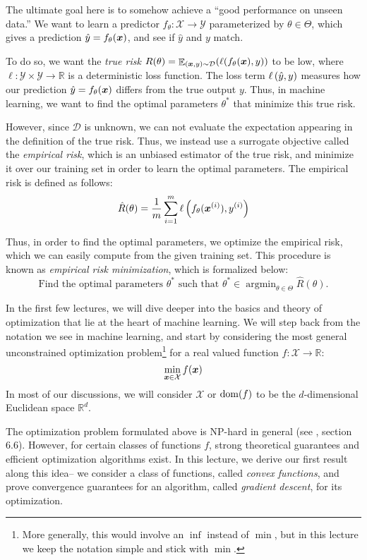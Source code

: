 \documentclass{article}
\DeclareMathOperator*{\argmin}{\arg\min}
\DeclareMathOperator*{\E}{\mathbb{E}}
\newcommand{\R}{\mathbb{R}}
\newcommand{\X}{\mathcal{X}}
\begin{document}
The ultimate goal here is to somehow achieve a ``good performance on unseen data.'' 
We want to learn a predictor $f_\theta: \mathcal{X} \to \mathcal{Y}$ parameterized by $\theta \in \Theta$, which gives a prediction $\hat{y} = f_\theta({\bm{x}})$, and see if $\hat{y}$ and $y$ match.

To do so, we want the \emph{true risk} $R(\theta) = \E_{(\vx, y) \sim \mathcal{D}}(\ell(f_\theta(\vx), y))$ to be low, where $\ell:\mathcal{Y}\times\mathcal{Y}\to \mathbb{R}$ is a deterministic loss function.
The loss term $\ell\left(\hat{y}, y\right)$ measures how our prediction $\hat{y} = f_\theta({\bm{x}})$ differs from the true output $y$. 
Thus, in machine learning, we want to find the optimal parameters $\theta^\ast$ that minimize this true risk.

However, since $\mathcal{D}$ is unknown, we can not evaluate the expectation appearing in the definition of the true risk.
Thus, we instead use a surrogate objective called the \emph{empirical risk}, which is an unbiased estimator of the true risk, and minimize it over our training set in order to learn the optimal parameters.
The empirical risk is defined as follows:
\[
\hat{R}(\theta) 
= 
\frac{1}{m}\sum_{i=1}^m 
    \ell\left(
        f_\theta({\bm{x}}^{(i)}), y^{(i)}
    \right)
\]

Thus, in order to find the optimal parameters, we optimize the empirical risk, which we can easily compute from the given training set.
This procedure is known as \emph{empirical risk minimization}, which is formalized below:
\[
\text{
Find the optimal parameters $\theta^\ast$ such that $\theta^\ast \in \argmin_{\theta\in\Theta} \hat{R}(\theta)$.
}
\]

In the first few lectures, we will dive deeper into the basics and theory of optimization that lie at the heart of machine learning. 
We will step back from the notation we see in machine learning, and start by considering the most general unconstrained optimization problem\footnote{More generally, this would involve an $\inf$ instead of $\min$, but in this lecture we keep the notation simple and stick with $\min$.} for a real valued function $f:\X\to\R$:
\[
\min_{\vx\in\X} f(\vx)
\]
In most of our discussions, we will consider $\X$ or $\operatorname{dom}(f)$ to be the $d$-dimensional Euclidean space $\R^d$.

The optimization problem formulated above is NP-hard in general (see \cite{bubeck2015convex}, section 6.6). 
However, for certain classes of functions $f$, strong theoretical guarantees and efficient optimization algorithms exist. 
In this lecture, we derive our first result along this idea-- we consider a class of functions, called \emph{convex functions}, and prove convergence guarantees for an algorithm, called \emph{gradient descent}, for its optimization.
\end{document}
